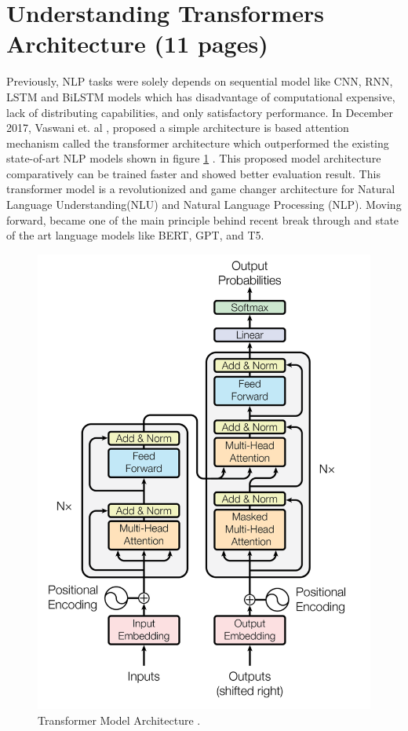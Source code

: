 \documentclass[%
	BCOR=8mm, %
	DIV=12, 
	toc=bibliography, %
	toc=listof, %
	oneside, %
	egregdoesnotlikesansseriftitles, %
	]{scrbook}
\begin{document}
\section{Understanding Transformers Architecture (11 pages)}
Previously, NLP tasks were solely depends on sequential model like CNN, RNN, LSTM and BiLSTM models which has disadvantage of computational expensive, lack of distributing 
capabilities, and only satisfactory performance. In December 2017, Vaswani et. al \cite{vaswani_attention_2017}, proposed a simple architecture is based attention mechanism called 
the transformer architecture which outperformed the existing state-of-art NLP models shown in figure \ref{diag:TransformerArchitecture} . This proposed model architecture  comparatively 
can be  trained faster and showed better evaluation result. This transformer model is a revolutionized and game changer architecture for Natural Language Understanding(NLU) and Natural
Language Processing (NLP). Moving forward, became one of the main principle behind recent break through and state of the art language models like BERT, GPT, and T5.\\ 
 
\begin{figure}[h!]
\centering
\includegraphics[width=.50\textwidth]{img/TransformerArchitecture.png}
\caption[Transformer Architecture]{Transformer Model Architecture \cite{vaswani_attention_2017}.}
\label{diag:TransformerArchitecture}
\end{figure}
\end{document}
